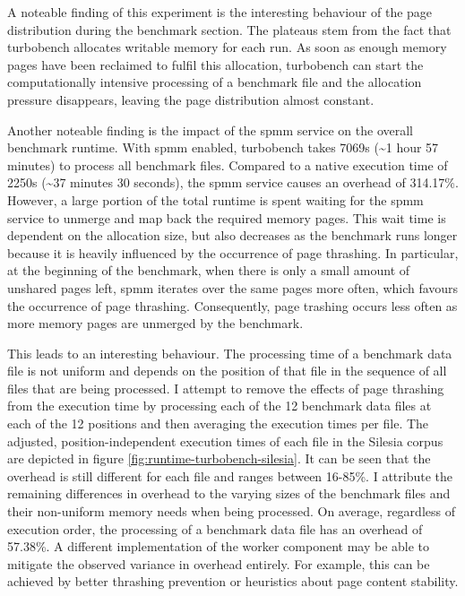 A noteable finding of this experiment is the interesting behaviour of the page distribution during the benchmark section.
The plateaus stem from the fact that turbobench allocates writable memory for each run.
As soon as enough memory pages have been reclaimed to fulfil this allocation, turbobench can start the computationally intensive processing of a benchmark file and the allocation pressure disappears, leaving the page distribution almost constant.

Another noteable finding is the impact of the \ac{spmm} service on the overall benchmark runtime.
With \ac{spmm} enabled, turbobench takes 7069s (\textasciitilde{}1 hour 57 minutes) to process all benchmark files.
Compared to a native execution time of 2250s (\textasciitilde{}37 minutes 30 seconds), the \ac{spmm} service causes an overhead of 314.17\%.
However, a large portion of the total runtime is spent waiting for the \ac{spmm} service to unmerge and map back the required memory pages.
This wait time is dependent on the allocation size, but also decreases as the benchmark runs longer because it is heavily influenced by the occurrence of page thrashing.
In particular, at the beginning of the benchmark, when there is only a small amount of unshared pages left, \ac{spmm} iterates over the same pages more often, which favours the occurrence of page thrashing.
Consequently, page trashing occurs less often as more memory pages are unmerged by the benchmark.

This leads to an interesting behaviour.
The processing time of a benchmark data file is not uniform and depends on the position of that file in the sequence of all files that are being processed.
I attempt to remove the effects of page thrashing from the execution time by processing each of the 12 benchmark data files at each of the 12 positions and then averaging the execution times per file.
The adjusted, position-independent execution times of each file in the Silesia corpus are depicted in figure \ref{fig:runtime-turbobench-silesia}.
It can be seen that the overhead is still different for each file and ranges between 16-85\%.
I attribute the remaining differences in overhead to the varying sizes of the benchmark files and their non-uniform memory needs when being processed.
On average, regardless of execution order, the processing of a benchmark data file has an overhead of 57.38\%.
A different implementation of the worker component may be able to mitigate the observed variance in overhead entirely.
For example, this can be achieved by better thrashing prevention or heuristics about page content stability.

